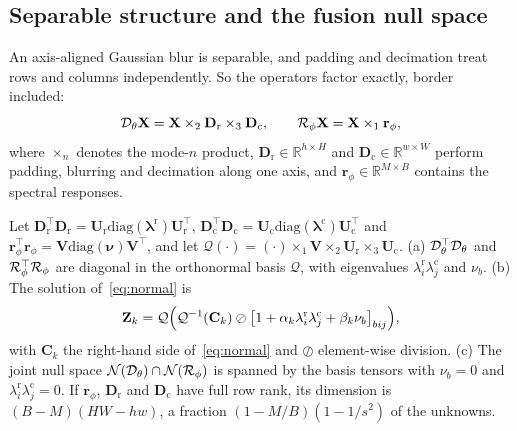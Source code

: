 \documentclass[10pt,twocolumn,letterpaper]{article}
\begin{document}
\subsection{Separable structure and the fusion null space}
\label{sec:kron}
An axis-aligned Gaussian blur is separable, and padding and decimation treat rows and columns independently. So the operators factor exactly, border included:
\begin{equation}
\mathcal{D}_\theta\mathbf{X}=\mathbf{X}\times_2\mathbf{D}_{\mathrm{r}}\times_3\mathbf{D}_{\mathrm{c}},\qquad \mathcal{R}_\phi\mathbf{X}=\mathbf{X}\times_1\mathbf{r}_\phi,
\label{eq:modes}
\end{equation}
where $\times_n$ denotes the mode-$n$ product, $\mathbf{D}_{\mathrm{r}}\in\mathbb{R}^{h\times H}$ and $\mathbf{D}_{\mathrm{c}}\in\mathbb{R}^{w\times W}$ perform padding, blurring and decimation along one axis, and $\mathbf{r}_\phi\in\mathbb{R}^{M\times B}$ contains the spectral responses.
\begin{theorem}
\label{thm:kron}
Let $\mathbf{D}_{\mathrm{r}}^{\top}\mathbf{D}_{\mathrm{r}}=\mathbf{U}_{\mathrm{r}}\mathrm{diag}(\bm{\lambda}^{\mathrm{r}})\mathbf{U}_{\mathrm{r}}^{\top}$, $\mathbf{D}_{\mathrm{c}}^{\top}\mathbf{D}_{\mathrm{c}}=\mathbf{U}_{\mathrm{c}}\mathrm{diag}(\bm{\lambda}^{\mathrm{c}})\mathbf{U}_{\mathrm{c}}^{\top}$ and $\mathbf{r}_\phi^{\top}\mathbf{r}_\phi=\mathbf{V}\mathrm{diag}(\bm{\nu})\mathbf{V}^{\top}$, and let $\mathcal{Q}(\cdot)=(\cdot)\times_1\mathbf{V}\times_2\mathbf{U}_{\mathrm{r}}\times_3\mathbf{U}_{\mathrm{c}}$.
(a) $\mathcal{D}_\theta^{\top}\mathcal{D}_\theta$ and $\mathcal{R}_\phi^{\top}\mathcal{R}_\phi$ are diagonal in the orthonormal basis $\mathcal{Q}$, with eigenvalues $\lambda^{\mathrm{r}}_i\lambda^{\mathrm{c}}_j$ and $\nu_b$.
(b) The solution of~\eqref{eq:normal} is
\begin{equation}
\mathbf{Z}_k=\mathcal{Q}\Big(\mathcal{Q}^{-1}(\mathbf{C}_k)\oslash\big[1+\alpha_k\lambda^{\mathrm{r}}_i\lambda^{\mathrm{c}}_j+\beta_k\nu_b\big]_{bij}\Big),
\label{eq:kronstep}
\end{equation}
with $\mathbf{C}_k$ the right-hand side of~\eqref{eq:normal} and $\oslash$ element-wise division.
(c) The joint null space $\mathcal{N}(\mathcal{D}_\theta)\cap\mathcal{N}(\mathcal{R}_\phi)$ is spanned by the basis tensors with $\nu_b=0$ and $\lambda^{\mathrm{r}}_i\lambda^{\mathrm{c}}_j=0$. If $\mathbf{r}_\phi$, $\mathbf{D}_{\mathrm{r}}$ and $\mathbf{D}_{\mathrm{c}}$ have full row rank, its dimension is $(B-M)(HW-hw)$, a fraction $(1-M/B)(1-1/s^2)$ of the unknowns.
\end{theorem}
\end{document}
